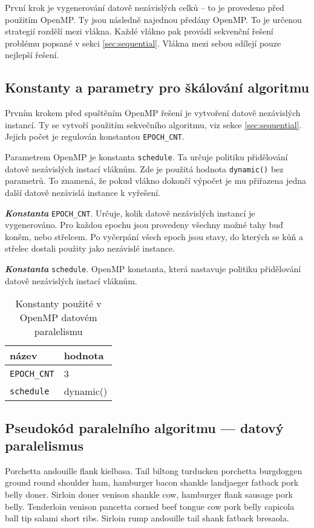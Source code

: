 \documentclass{article}
\newcommand{\const}[1]{\texttt{#1}}
\newcommand{\konstanta}[1]{\textbf{\textit{Konstanta}} \const{#1}.}
\begin{document}
    První krok je vygenerování datově nezávislých celků – to je provedeno před použitím OpenMP.
    Ty jsou následně najednou předány OpenMP. To je určenou strategií rozdělí mezi vlákna.
    Každé vlákno pak provádí sekvenční řešení problému popsané v sekci \ref{sec:sequential}.
    Vlákna mezi sebou sdílejí pouze nejlepší řešení.

    \subsection{Konstanty a parametry pro škálování algoritmu}
    Prvním krokem před spuštěním OpenMP řešení je vytvoření datově nezávislých instancí.
    Ty se vytvoří použitím sekvečního algoritmu, viz sekce \ref{sec:sequential}.
    Jejich počet je regulován konstantou \const{EPOCH_CNT}.

    Parametrem OpenMP je konstanta \const{schedule}. Ta určuje politiku přidělování datově nezávislých instací vláknům.
    Zde je použitá hodnota \const{dynamic()} bez parametrů. To znamená, že pokud vlákno dokončí výpočet je mu
    přiřazena jedna další datově nezávislá instance k vyřešení.

    \konstanta{EPOCH_CNT} Určuje, kolik datově nezávislých instancí je vygenerováno.
    Pro každou epochu jsou provedeny všechny možné tahy buď koněm, nebo střelcem.
    Po vyčerpání všech epoch jsou stavy, do kterých se kůň a střelec dostali
    použity jako nezávislé instance.

    \konstanta{schedule} OpenMP konstanta, která nastavuje politiku přidělování datově nezávislých instací vláknům.

    \begin{table}[hb]
        \centering
        \begin{tabular}{|l|l|}
            \hline
            název      & hodnota \\ \hline
            \const{EPOCH_CNT} & 3       \\ \hline
            \const{schedule} & dynamic()      \\ \hline
        \end{tabular}
        \caption{Konstanty použité v OpenMP datovém paralelismu}
        \label{tab:data-par-constants}
    \end{table}

    \subsection{Pseudokód paralelního algoritmu — datový paralelismus}
    Porchetta andouille flank kielbasa. Tail biltong turducken porchetta burgdoggen ground round shoulder ham, hamburger bacon shankle landjaeger fatback pork belly doner. Sirloin doner venison shankle cow, hamburger flank sausage pork belly. Tenderloin venison pancetta corned beef tongue cow pork belly capicola ball tip salami short ribs. Sirloin rump andouille tail shank fatback bresaola.
\end{document}
